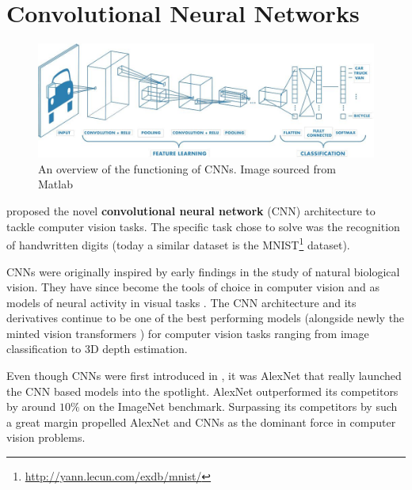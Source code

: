 
\usetikzlibrary{calc,shapes,positioning}

\chapter{Convolutional Neural Networks}\label{chap:cnn}


\begin{figure}[ht]
    \captionsetup{justification=centering}
    \centering
    \includegraphics[width=\textwidth]{chapters/assets/cnn.jpg}
    \caption{An overview of the functioning of CNNs. Image sourced from Matlab\protect\footnotemark}
    \label{fig:cnn-overview}
\end{figure}

\citeauthor{LeCun1989} proposed the novel \textbf{convolutional neural network} (CNN) architecture to tackle computer vision tasks. The specific task \citeauthor{LeCun1989} chose to solve was the recognition of handwritten digits (today a similar dataset is the MNIST\footnote{\url{http://yann.lecun.com/exdb/mnist/}} dataset). 


CNNs were originally inspired by early findings in the study of natural biological vision. They have since become the tools of choice in computer vision and as models of neural activity in visual tasks \parencite{Kuzovkin2018, Lindsay2021, Eickenberg2017}. The CNN architecture and its derivatives continue to be one of the best performing models (alongside newly the minted vision transformers \parencite{Dosovitskiy2020}) for computer vision tasks ranging from image classification to 3D depth estimation.

Even though CNNs were first introduced in \citeyear{LeCun1989}, it was AlexNet \parencite{AlexNet2012} that really launched the CNN based models into the spotlight. AlexNet outperformed its competitors by around $10\%$ on the ImageNet \parencite{deng2009imagenet} benchmark. Surpassing its competitors by such a great margin propelled AlexNet and CNNs as the dominant force in computer vision problems.


